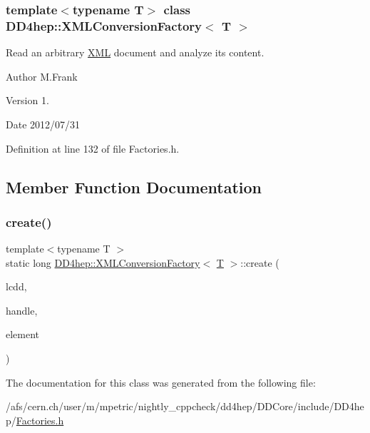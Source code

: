 \subsubsection*{template$<$typename T$>$\newline
class D\+D4hep\+::\+X\+M\+L\+Conversion\+Factory$<$ T $>$}

Read an arbitrary \hyperlink{namespace_d_d4hep_1_1_x_m_l}{X\+ML} document and analyze it\textquotesingle{}s content. 

\begin{DoxyAuthor}{Author}
M.\+Frank 
\end{DoxyAuthor}
\begin{DoxyVersion}{Version}
1. 
\end{DoxyVersion}
\begin{DoxyDate}{Date}
2012/07/31 
\end{DoxyDate}


Definition at line 132 of file Factories.\+h.



\subsection{Member Function Documentation}
\hypertarget{class_d_d4hep_1_1_x_m_l_conversion_factory_af1d0a581aaec7bc8a40aeb01e6b2929e}{}\label{class_d_d4hep_1_1_x_m_l_conversion_factory_af1d0a581aaec7bc8a40aeb01e6b2929e} 
\subsubsection{\texorpdfstring{create()}{create()}}
{\footnotesize\ttfamily template$<$typename T $>$ \\
static long \hyperlink{class_d_d4hep_1_1_x_m_l_conversion_factory}{D\+D4hep\+::\+X\+M\+L\+Conversion\+Factory}$<$ \hyperlink{class_t}{T} $>$\+::create (\begin{DoxyParamCaption}\item[{\hyperlink{class_d_d4hep_1_1_geometry_1_1_l_c_d_d}{Geometry\+::\+L\+C\+DD} \&}]{lcdd,  }\item[{\hyperlink{struct_d_d4hep_1_1_plugin_factory_base_ab13458952a5b4a91f5130d3ee4db4d33}{ref\+\_\+t} \&}]{handle,  }\item[{\hyperlink{struct_d_d4hep_1_1_plugin_factory_base_aedebe6835e2705756763812545bcb8fd}{xml\+\_\+h}}]{element }\end{DoxyParamCaption})\hspace{0.3cm}{\ttfamily [static]}}



The documentation for this class was generated from the following file\+:\begin{DoxyCompactItemize}
\item 
/afs/cern.\+ch/user/m/mpetric/nightly\+\_\+cppcheck/dd4hep/\+D\+D\+Core/include/\+D\+D4hep/\hyperlink{_d_d_core_2include_2_d_d4hep_2_factories_8h}{Factories.\+h}\end{DoxyCompactItemize}
